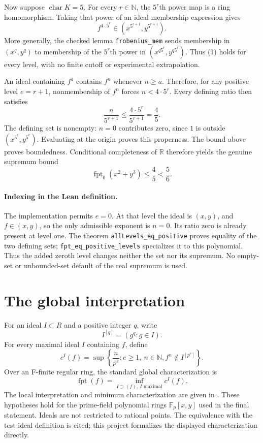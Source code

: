 \documentclass[11pt,a4paper]{article}
\newcommand{\lean}[1]{\nolinkurl{#1}}
\newcommand{\F}{\mathbb F}
\newcommand{\fpt}{\operatorname{fpt}}
\begin{document}
Now suppose $\operatorname{char}K=5$. For every $r\in\mathbb N$, the
$5^r$th power map is a ring homomorphism. Taking that power of an ideal
membership expression gives
\[
 f^{4\cdot5^r}\in
 (x^{5^{r+1}},y^{5^{r+1}}).
 \tag{1}
\]
More generally, the checked lemma \lean{frobenius_mem} sends membership
in $(x^q,y^q)$ to membership of the $5^r$th power in
$(x^{q5^r},y^{q5^r})$. Thus (1) holds for every level, with no finite
cutoff or experimental extrapolation.

An ideal containing $f^a$ contains $f^n$ whenever $n\ge a$.
Therefore, for any positive level $e=r+1$, nonmembership of $f^n$
forces $n<4\cdot5^r$. Every defining ratio then satisfies
\[
 \frac{n}{5^{r+1}}\le\frac{4\cdot5^r}{5^{r+1}}=\frac45.
\]
The defining set is nonempty: $n=0$ contributes zero, since $1$ is
outside $(x^{5^e},y^{5^e})$. Evaluating at the origin proves this
properness. The bound above proves boundedness. Conditional completeness
of $\mathbb R$ therefore yields the genuine supremum bound
\[
 \boxed{\fpt_0(x^2+y^3)\le\frac45<\frac56.}
 \tag{2}
\]

\paragraph{Indexing in the Lean definition.}
The implementation permits $e=0$. At that level the ideal is $(x,y)$,
and $f\in(x,y)$, so the only admissible exponent is $n=0$. Its ratio
zero is already present at level one. The theorem
\lean{allLevels_eq_positive} proves equality of the two defining sets;
\lean{fpt_eq_positive_levels} specializes it to this polynomial.
Thus the added zeroth level changes neither the set nor its supremum.
No empty-set or unbounded-set default of the real supremum is used.

\newpage
\section{The global interpretation}
For an ideal $I\subset R$ and a positive integer $q$, write
\[
 I^{[q]}=(g^q:g\in I).
\]
For every maximal ideal $I$ containing $f$, define
\[
 c^I(f)=\sup\left\{\frac{n}{p^e}: e\ge1,\ n\in\mathbb N,
 f^n\notin I^{[p^e]}\right\}.
\]
Over an F-finite regular ring, the standard global characterization is
\[\fpt(f)=\inf_{I\supset(f),\ I\text{ maximal}}c^I(f).\]
The local interpretation and minimum characterization are given in
\cite[\S3, Proposition 3.2(iii--iv)]{bms}.
These hypotheses hold for the prime-field polynomial rings $\F_p[x,y]$
used in the final statement. Ideals are not restricted to rational points.
The equivalence with the test-ideal definition is cited; this project
formalizes the displayed characterization directly.
\end{document}
